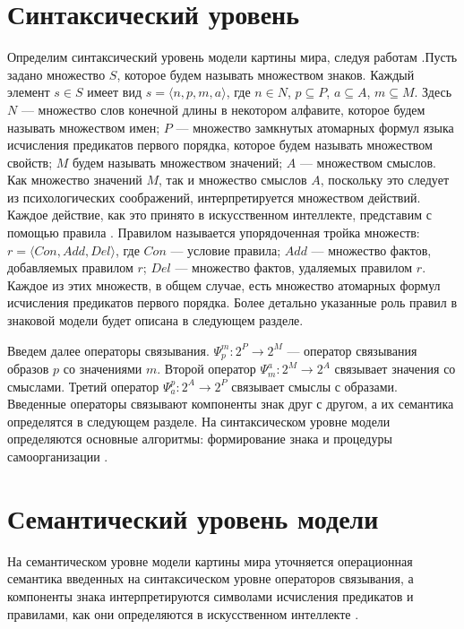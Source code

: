 \documentclass[12pt]{scrartcl}
\begin{document}
	\section{Синтаксический уровень}\label{sec:sintaxis}

	Определим синтаксический уровень модели картины мира, следуя работам \cite{Osipov2014c,Osipov2016c}.Пусть задано множество $S$, которое будем называть множеством знаков. Каждый элемент $s\in S$ имеет вид $s=\langle n,p,m,a\rangle$, где $n\in N$, $p\subseteq P$, $a\subseteq A$, $m\subseteq M$. Здесь $N$ --- множество слов конечной длины в некотором алфавите, которое будем называть множеством имен; $P$ --- множество замкнутых атомарных формул языка исчисления предикатов первого порядка, которое будем называть множеством свойств; $M$ будем называть множеством значений; $A$ — множеством смыслов. Как множество значений $M$, так и множество смыслов $A$, поскольку это следует из психологических соображений, интерпретируется множеством действий. Каждое действие, как это принято в искусственном интеллекте, представим с помощью правила \cite{Osipov2008b}. Правилом называется упорядоченная тройка множеств:	$r=\langle Con,Add,Del\rangle$, где $Con$ --- условие правила; $Add$ --- множество фактов, добавляемых правилом $r$; $Del$ --- множество фактов, удаляемых правилом $r$. Каждое из этих множеств, в общем случае, есть множество атомарных формул исчисления предикатов первого порядка. Более детально указанные роль правил в знаковой модели будет описана в следующем разделе.
	
	Введем далее операторы связывания. $\Psi_p^m:2^P\rightarrow 2^M$ --- оператор связывания образов $p$ со значениями $m$. Второй оператор $\Psi_m^a:2^M\rightarrow 2^A$ связывает значения со	смыслами. Третий оператор $\Psi_a^p: 2^A\rightarrow 2^P$ связывает смыслы с образами. Введенные операторы связывают компоненты знак друг с другом, а их семантика определятся в следующем разделе. На синтаксическом уровне модели определяются основные алгоритмы: формирование знака и процедуры самоорганизации \cite{Osipov2014c}.
		

	\section{Семантический уровень модели}\label{sec:semantic}
	
	На семантическом уровне модели картины мира уточняется операционная семантика введенных на синтаксическом уровне операторов связывания, а компоненты знака интерпретируются символами исчисления предикатов и правилами, как они определяются в искусственном интеллекте \cite{Osipov2015c,Osipov2016a}.
	
\end{document}
